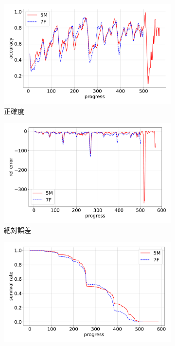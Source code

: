 \begin{figure}[t]
\centering
\begin{subfigure}[b]{0.8\linewidth}
    \includegraphics[width=\linewidth]{pdf/compare/NT5M_and_NT7F/accuracy.pdf}
    \caption{正確度}
    \label{fig:NT5M_and_NT7F_accuracy}
\end{subfigure}
\begin{subfigure}[b]{0.8\linewidth}
    \includegraphics[width=\linewidth]{pdf/compare/NT5M_and_NT7F/error_abs.pdf}
    \caption{絶対誤差}
    \label{fig:NT5M_and_NT7F_error_abs_diff}
\end{subfigure}
\begin{subfigure}[b]{0.8\linewidth}
    \includegraphics[width=\linewidth]{pdf/compare/NT5M_and_NT7F/survival.pdf}

\end{subfigure}
\end{figure}
